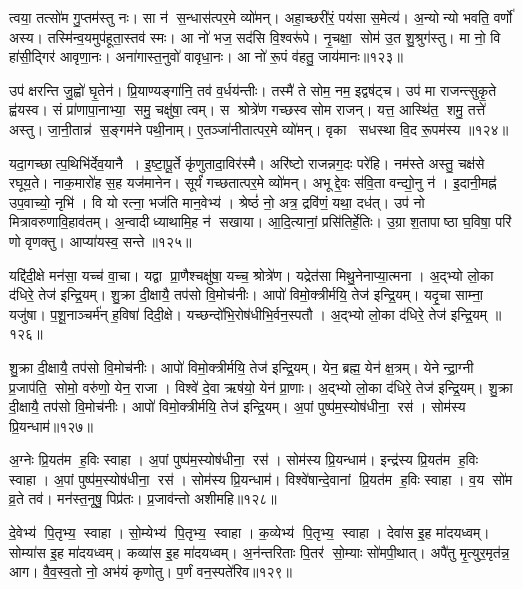 त्वया॒ तत्सो॑म गु॒प्तम॑स्तु नः।
सा न॑ स॒न्धास॑त्पर॒मे व्यो॑मन्।
अहा॒च्छरी॑रं॒ पय॑सा स॒मेत्य॑।
अ॒न्योन्यो भवति॒ वर्णो॑ अस्य।
तस्मि॑न्व॒यमुप॑हूता॒स्तव॑ स्मः।
आ नो॑ भज॒ सद॑सि वि॒श्वरू॑पे।
नृ॒चक्षा॒ सोम॑ उ॒त शु॒श्रुग॑स्तु।
मा नो॒ वि हा॑सी॒द्गिर॑ आवृणा॒नः।
अना॑गास्त॒नुवो॑ वावृधा॒नः।
आ नो॑ रू॒पं व॑हतु॒ जाय॑मानः॥१२३॥

उप॑ क्षरन्ति जु॒ह्वो॑ घृ॒तेन॑।
प्रि॒याण्यङ्गा॑नि॒ तव॑ व॒र्धय॑न्तीः।
तस्मै॑ ते सोम॒ नम॒ इद्वष॑ट्च।
उप॑ मा राजन्त्सुकृ॒ते ह्व॑यस्व।
सं प्रा॑णापा॒नाभ्या॒ समु॒ चक्षु॑षा॒ त्वम्।
स श्रोत्रे॑ण गच्छस्व सोम राजन्।
यत्त॒ आस्थि॑त॒ शमु॒ तत्ते॑ अस्तु।
जा॒नी॒तान्न॑ स॒ङ्गम॑ने पथी॒नाम्।
ए॒तञ्जा॑नीतात्पर॒मे व्यो॑मन्।
वृका सधस्था वि॒द रू॒पम॑स्य ॥१२४॥

यदा॒गच्छात्प॒थिभि॑र्देव॒यानै।
इ॒ष्टा॒पू॒र्ते कृ॑णुतादा॒विर॑स्मै।
अरि॑ष्टो राजन्नग॒दः परे॑हि।
नम॑स्ते अस्तु॒ चक्ष॑से रघूय॒ते।
नाक॒मारो॑ह स॒ह यज॑मानेन।
सूर्यं॑ गच्छतात्पर॒मे व्यो॑मन्।
अभूद्दे॒वः स॑वि॒ता वन्द्यो॒नु न॑।
इ॒दानी॒मह्न॑ उप॒वाच्यो॒ नृभि॑।
वि यो रत्ना॒ भज॑ति मान॒वेभ्य॑।
श्रेष्ठं॑ नो॒ अत्र॒ द्रवि॑णं॒ यथा॒ दध॑त्।
उप॑ नो मित्रावरुणावि॒हाव॑तम्।
अ॒न्वादीध्याथामि॒ह न॑ सखाया।
आ॒दि॒त्यानां॒ प्रसि॑तिर्\mbox{}हे॒तिः।
उ॒ग्रा श॒तापाष्ठा घ॒विषा॒ परि॑ णो वृणक्तु।
आप्या॑यस्व॒ सन्ते॥१२५॥\anuvakamend[त्मना॒ जाय॑मानोऽस्य॒ दध॒त्पञ्च॑ च]

यद्दि॑दी॒क्षे मन॑सा॒ यच्च॑ वा॒चा।
यद्वा प्रा॒णैश्चक्षु॑षा॒ यच्च॒ श्रोत्रे॑ण।
यद्रेत॑सा मिथु॒नेनाप्या॒त्मना।
अ॒द्भ्यो लो॒का द॑धिरे॒ तेज॑ इन्द्रि॒यम्।
शु॒क्रा दी॒क्षायै॒ तप॑सो वि॒मोच॑नीः।
आपो॑ विमो॒क्त्रीर्मयि॒ तेज॑ इन्द्रि॒यम्।
यदृ॒चा साम्ना॒ यजु॑षा।
प॒शू॒नाञ्चर्म॑न् ह॒विषा॑ दिदी॒क्षे।
यच्छन्दो॑भि॒रोष॑धीभि॒र्वन॒स्पतौ।
अ॒द्भ्यो लो॒का द॑धिरे॒ तेज॑ इन्द्रि॒यम् ॥१२६॥

शु॒क्रा दी॒क्षायै॒ तप॑सो वि॒मोच॑नीः।
आपो॑ विमो॒क्त्रीर्मयि॒ तेज॑ इन्द्रि॒यम्।
येन॒ ब्रह्म॒ येन॑ क्ष॒त्रम्।
येनेन्द्रा॒ग्नी प्र॒जाप॑ति॒ सोमो॒ वरु॑णो॒ येन॒ राजा।
विश्वे॑ दे॒वा ऋष॑यो॒ येन॑ प्रा॒णाः।
अ॒द्भ्यो लो॒का द॑धिरे॒ तेज॑ इन्द्रि॒यम्।
शु॒क्रा दी॒क्षायै॒ तप॑सो वि॒मोच॑नीः।
आपो॑ विमो॒क्त्रीर्मयि॒ तेज॑ इन्द्रि॒यम्।
अ॒पां पुष्प॑म॒स्योष॑धीना॒ रस॑।
सोम॑स्य प्रि॒यन्धाम॑॥१२७॥

अ॒ग्नेः प्रि॒यत॑म ह॒विः स्वाहा।
अ॒पां पुष्प॑म॒स्योष॑धीना॒ रस॑।
सोम॑स्य प्रि॒यन्धाम॑।
इन्द्र॑स्य प्रि॒यत॑म ह॒विः स्वाहा।
अ॒पां पुष्प॑म॒स्योष॑धीना॒ रस॑।
सोम॑स्य प्रि॒यन्धाम॑।
विश्वे॑षान्दे॒वानां प्रि॒यत॑म ह॒विः स्वाहा।
व॒य सो॑म व्र॒ते तव॑।
मन॑स्त॒नूषु॒ पिप्र॑तः।
प्र॒जाव॑न्तो अशीमहि॥१२८॥

दे॒वेभ्य॑ पि॒तृभ्य॒ स्वाहा।
सो॒म्येभ्य॑ पि॒तृभ्य॒ स्वाहा।
क॒व्येभ्य॑ पि॒तृभ्य॒ स्वाहा।
देवा॑स इ॒ह मा॑दयध्वम्।
सोम्या॑स इ॒ह मा॑दयध्वम्।
कव्या॑स इ॒ह मा॑दयध्वम्।
अ॒न॑न्तरिताः पि॒तर॑ सो॒म्याः सो॑मपी॒थात्।
अपै॑तु मृ॒त्युर॒मृत॑न्न॒ आग\sn{}।
वै॒व॒स्व॒तो नो॒ अभ॑यं कृणोतु।
प॒र्णं वन॒स्पते॑रिव॥१२९॥

